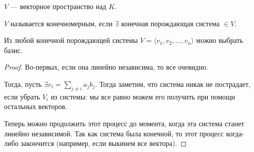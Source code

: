 \begin{definition}
    $V$ --- векторное пространство над  $K$.

     $V$ называется конечномерным, если  $\exists$ конечная порождающая система  $\in V$.
\end{definition}
\begin{lemma}
    Из любой конечной порождающей системы $V = \langle v_1, v_2, \ldots, v_n \rangle$ можно выбрать базис.
\end{lemma}
\begin{proof}
    Во-первых, если она линейно независима, то все очевидно.

    Тогда, пусть $\exists v_i = \sum\limits_{j \neq i}a_j b_j$. Тогда заметим, что система никак не пострадает, если убрать $V_i$ из системы: мы все равно можем его получить при помощи остальных векторов. 

    Теперь можно продолжить этот процесс до момента, когда эта система станет линейно независимой. Так как система была конечной, то этот процесс когда-либо закончится (например, если выкинем все вектора).
\end{proof}

